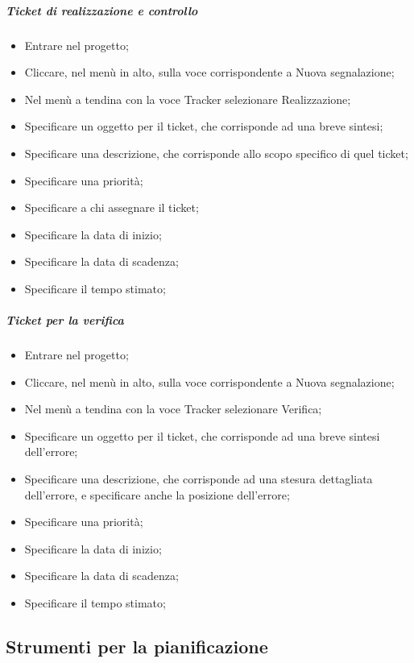 \subparagraph{Ticket di realizzazione e controllo}
\begin{itemize}
\item Entrare nel progetto;
\item Cliccare, nel menù in alto, sulla voce corrispondente a Nuova segnalazione;
\item Nel menù a tendina con la voce Tracker selezionare Realizzazione;
\item Specificare un oggetto per il ticket, che corrisponde ad una breve sintesi;
\item Specificare una descrizione, che corrisponde allo scopo specifico di quel ticket;
\item Specificare una priorità;
\item Specificare a chi assegnare il ticket;
\item Specificare la data di inizio;
\item Specificare la data di scadenza;
\item Specificare il tempo stimato;
\end{itemize}

\subparagraph{Ticket per la verifica}
\begin{itemize}
\item Entrare nel progetto;
\item Cliccare, nel menù in alto, sulla voce corrispondente a Nuova segnalazione;
\item Nel menù a tendina con la voce Tracker selezionare Verifica;
\item Specificare un oggetto per il ticket, che corrisponde ad una breve sintesi dell'errore;
\item Specificare una descrizione, che corrisponde ad una stesura dettagliata dell'errore, e specificare anche la posizione dell'errore;
\item Specificare una priorità;
\item Specificare la data di inizio;
\item Specificare la data di scadenza;
\item Specificare il tempo stimato;
\end{itemize}



\subsection{Strumenti per la pianificazione}
\label{}
